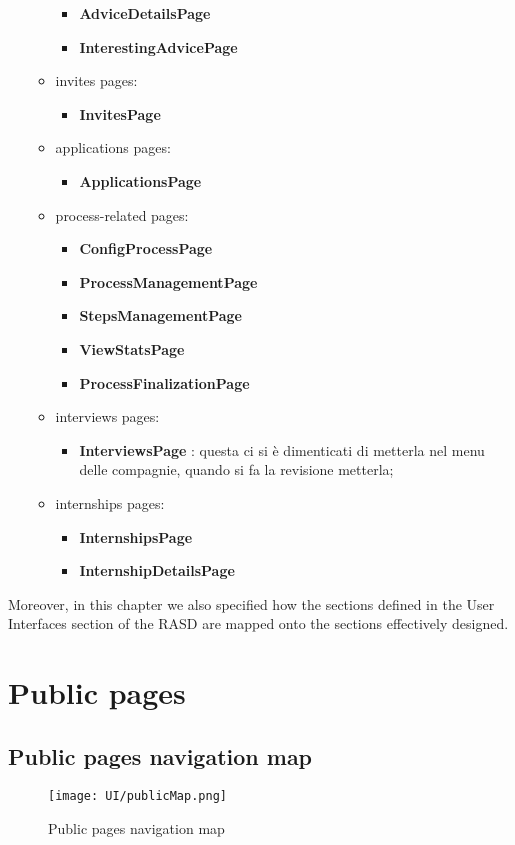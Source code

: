 \begin{itemize}
\begin{itemize}
\begin{itemize}
				\item \textbf{AdviceDetailsPage}
				\item \textbf{InterestingAdvicePage}
			\end{itemize}
			\item invites pages:
			\begin{itemize}
				\item \textbf{InvitesPage}
			\end{itemize}
			\item applications pages:
			\begin{itemize}
				\item \textbf{ApplicationsPage}
			\end{itemize}
			\item process-related pages:
			\begin{itemize}
				\item \textbf{ConfigProcessPage}
				\item \textbf{ProcessManagementPage}
				\item \textbf{StepsManagementPage}
				\item \textbf{ViewStatsPage}
				\item \textbf{ProcessFinalizationPage}
			\end{itemize}
			\item interviews pages:
			\begin{itemize}
				\item \textbf{InterviewsPage} : questa ci si è dimenticati di metterla nel menu delle compagnie, quando si fa la revisione metterla;
			\end{itemize}
			\item internships pages:
			\begin{itemize}
				\item \textbf{InternshipsPage}
				\item \textbf{InternshipDetailsPage}
			\end{itemize}
		\end{itemize}
	\end{itemize}
	
	Moreover, in this chapter we also specified how the sections defined in the User Interfaces section of the RASD are mapped onto the sections effectively designed.
	
	\section{Public pages}
	\subsection{Public pages navigation map}
	\begin{figure}[H]
		\centering
		\caption{Public pages navigation map}
		\texttt{[image: UI/publicMap.png]}
	\end{figure}
